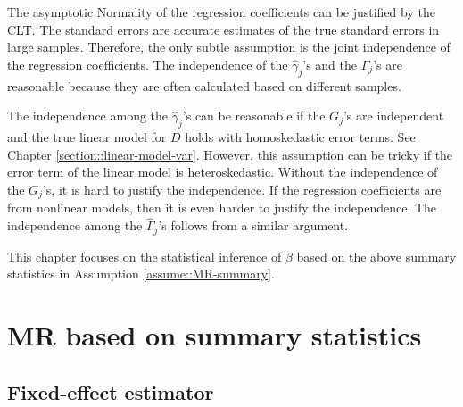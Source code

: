 
The asymptotic Normality of the regression coefficients can be justified by the CLT. The standard errors are accurate estimates of the true standard errors in large samples. Therefore, the only subtle assumption is the joint independence of the regression coefficients. The independence of the $\hat{\gamma}_j$'s and the $\hat{\Gamma}_j$'s are reasonable because they are often calculated based on different samples. 

The independence among the $\hat{\gamma}_j$'s  can be reasonable if the $G_j$'s are independent and the true linear model for $D$ holds with homoskedastic error terms. See Chapter \ref{section::linear-model-var}. However, this assumption can be tricky if the error term of the linear model is heteroskedastic. Without the independence of the $G_j$'s, it is hard to justify the independence. If the regression coefficients are from nonlinear models, then it is even harder to justify the independence. The independence among the $\hat{\Gamma}_j$'s follows from a similar argument. 

This chapter focuses on the statistical inference of $\beta$ based on the above summary statistics in Assumption \ref{assume::MR-summary}. 



\section{MR based on summary statistics}


\subsection{Fixed-effect estimator}\label{sec::mr-fixed-effect}


